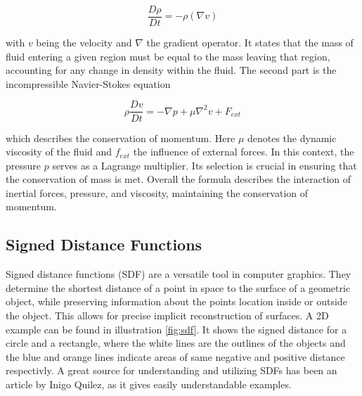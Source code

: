 \documentclass[intern]{cgMA}
\begin{document}
    \begin{equation}
        \frac{D \rho}{D t} = -\rho(\nabla v)
    \end{equation}

    with $v$ being the velocity and $\nabla$ the gradient operator. It states that the mass of fluid entering a given region must be equal to the mass leaving that region, accounting for any change in density within the fluid. The second part is the incompressible Navier-Stokes equation

    \begin{equation}
        \rho \frac{D v}{D t} = -\nabla p + \mu \nabla^2 v + F_{ext}
    \end{equation}

    which describes the conservation of momentum. Here $\mu$ denotes the dynamic viscosity of the fluid and $f_{ext}$ the influence of external forces. In this context, the pressure $p$ serves as a Lagrange multiplier. Its selection is crucial in ensuring that the conservation of mass is met. Overall the formula describes the interaction of inertial forces, pressure, and viscosity, maintaining the conservation of momentum.

    \subsection{Signed Distance Functions}
    Signed distance functions (SDF) are a versatile tool in computer graphics. They determine the shortest distance of a point in space to the surface of a geometric object, while preserving information about the points location inside or outside the object. This allows for precise implicit reconstruction of surfaces. A 2D example can be found in illustration \ref{fig:sdf}. It shows the signed distance for a circle and a rectangle, where the white lines are the outlines of the objects and the blue and orange lines indicate areas of same negative and positive distance respectivly. A great source for understanding and utilizing SDFs has been an article by Inigo Quilez, as it gives easily understandable examples. \cite{iquilezles}
\end{document}
